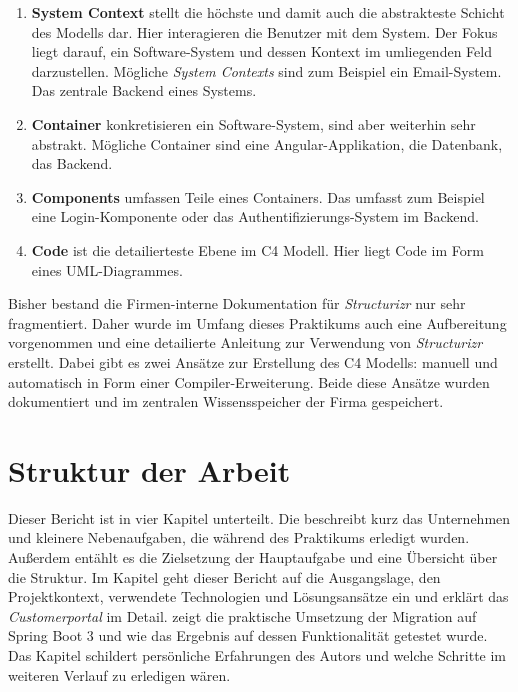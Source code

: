 \begin{enumerate}
    \item \textbf{System Context} stellt die höchste und damit auch die abstrakteste Schicht des Modells dar. Hier interagieren die Benutzer mit dem System. Der Fokus liegt darauf, ein Software-System und dessen Kontext im umliegenden Feld darzustellen. Mögliche \textit{System Contexts} sind zum Beispiel ein Email-System. Das zentrale Backend eines Systems.
    \item \textbf{Container} konkretisieren ein Software-System, sind aber weiterhin sehr abstrakt. Mögliche Container sind eine Angular-Applikation, die Datenbank, das Backend.
    \item \textbf{Components} umfassen Teile eines Containers. Das umfasst zum Beispiel eine Login-Komponente oder das Authentifizierungs-System im Backend.
    \item \textbf{Code} ist die detailierteste Ebene im C4 Modell. Hier liegt Code im Form eines UML-Diagrammes.
\end{enumerate}

Bisher bestand die Firmen-interne Dokumentation für \textit{Structurizr} nur sehr fragmentiert. Daher wurde im Umfang dieses Praktikums auch eine Aufbereitung vorgenommen und eine detailierte Anleitung zur Verwendung von \textit{Structurizr} erstellt. Dabei gibt es zwei Ansätze zur Erstellung des C4 Modells: manuell und automatisch in Form einer Compiler-Erweiterung. Beide diese Ansätze wurden dokumentiert und im zentralen Wissensspeicher der Firma gespeichert.

\section{Struktur der Arbeit}

Dieser Bericht ist in vier Kapitel unterteilt. Die  beschreibt kurz das Unternehmen und kleinere Nebenaufgaben, die während des Praktikums erledigt wurden. Außerdem entählt es die Zielsetzung der Hauptaufgabe und eine Übersicht über die Struktur. 
Im Kapitel  geht dieser Bericht auf die Ausgangslage, den Projektkontext, verwendete Technologien und Lösungsansätze ein und erklärt das \textit{Customerportal} im Detail.  zeigt die praktische Umsetzung der Migration auf Spring Boot 3 und wie das Ergebnis auf dessen Funktionalität getestet wurde. Das Kapitel  schildert persönliche Erfahrungen des Autors und welche Schritte im weiteren Verlauf zu erledigen wären.